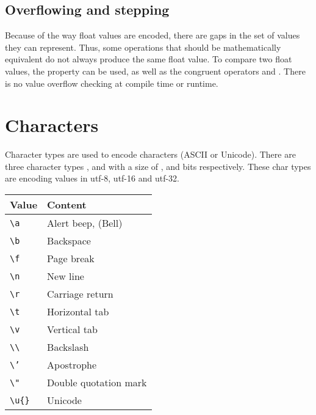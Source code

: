 \subsection{Overflowing and stepping}
\label{sec:orgd5d9f51}

Because of the way float values are encoded, there are gaps in the set of values
they can represent. Thus, some operations that should be mathematically
equivalent do not always produce the same float value. To compare two float
values, the property  can be used, as well as the congruent
operators \token{<=>} and \token{<!>}. There is no value overflow checking
at compile time or runtime.

\vfill%
\pagebreak

\section{Characters}
\label{sec:char_type}

Character types are used to encode characters (ASCII or Unicode). There are
three character types ,  and  with a size of
,  and  bits respectively. These char types are
encoding values in utf-8, utf-16 and utf-32.

\begin{center}
  \vspace{-5pt}
  \begin{tabular}{ll}
    Value & Content\\[0pt]
    \hline
    \texttt{\textbackslash{}a} & Alert beep, (Bell)\\[0pt]
    \texttt{\textbackslash{}b} & Backspace\\[0pt]
    \texttt{\textbackslash{}f} & Page break\\[0pt]
    \texttt{\textbackslash{}n} & New line\\[0pt]
    \texttt{\textbackslash{}r} & Carriage return\\[0pt]
    \texttt{\textbackslash{}t} & Horizontal tab\\[0pt]
    \texttt{\textbackslash{}v} & Vertical tab\\[0pt]
    \texttt{\textbackslash{}\textbackslash{}} & Backslash\\[0pt]
    \texttt{\textbackslash{}'} & Apostrophe\\[0pt]
    \texttt{\textbackslash{}"} & Double quotation mark\\[0pt]
    \texttt{\textbackslash{}u\{\}} & Unicode\\[0pt]
  \end{tabular}
\end{center}

